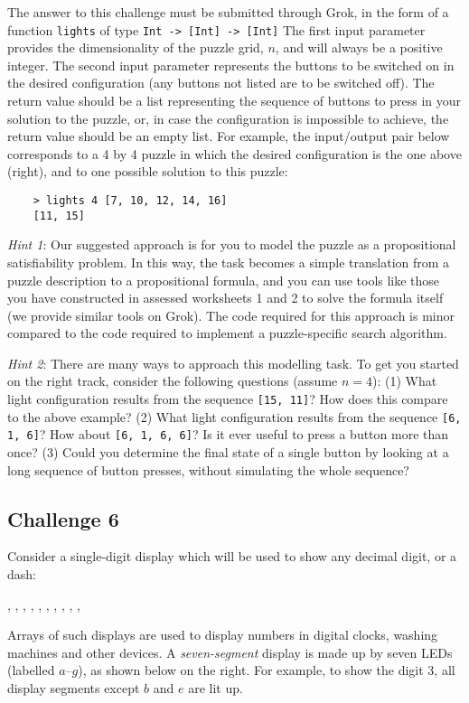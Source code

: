 \documentclass[12pt]{article}
\begin{document}
The answer to this challenge must be submitted through Grok,
in the form of a function {\tt lights} of type {\tt Int -> [Int] -> [Int]}
The first input parameter provides the dimensionality of the puzzle grid,
$n$, and will always be a positive integer.
The second input parameter represents the buttons to be switched on in the
desired configuration (any buttons not listed are to be switched off).
The return value should be a list representing the sequence of buttons
to press in your solution to the puzzle, or, in case the configuration is
impossible to achieve, the return value should be an empty list.
For example, the input/output pair below corresponds to a 4 by 4 puzzle
in which the desired configuration is the one above (right), and to one
possible solution to this puzzle:
\begin{verbatim}
    > lights 4 [7, 10, 12, 14, 16]
    [11, 15]
\end{verbatim}

\emph{Hint 1}: Our suggested approach is for you to model the puzzle as
a propositional satisfiability problem. In this way, the task becomes a
simple translation from a puzzle description to a propositional formula,
and you can use tools like those you have constructed in assessed worksheets
1 and 2 to solve the formula itself (we provide similar tools on Grok).
The code required for this approach is minor compared to the code required
to implement a puzzle-specific search algorithm.

\emph{Hint 2}: There are many ways to approach this modelling task. 
To get you started on the right track, consider the following questions 
(assume $n=4$):
(1) What light configuration results from the sequence {\tt [15, 11]}?
How does this compare to the above example?
(2) What light configuration results from the sequence {\tt [6, 1, 6]}?
How about {\tt [6, 1, 6, 6]}? Is it ever useful to press a button more
than once?
(3) Could you determine the final state of a single button by looking at a
long sequence of button presses, without simulating the whole sequence?

\subsection*{Challenge 6}

Consider a single-digit display which will be used to show any
decimal digit, or a dash:
\begin{center}
\barZero,
\barOne,
\barTwo,
\barThree,
\barFour,
\barFive,
\barSix,
\barSeven,
\barEight,
\barNine,
\barDash 
\end{center}
Arrays of such displays are used to display numbers in 
digital clocks, washing machines and other devices.
A \emph{seven-segment} display is made up by seven LEDs 
(labelled $a$--$g$), as shown below on the right.
For example, to show the digit 3, all display segments except
$b$ and $e$ are lit up.
\end{document}
